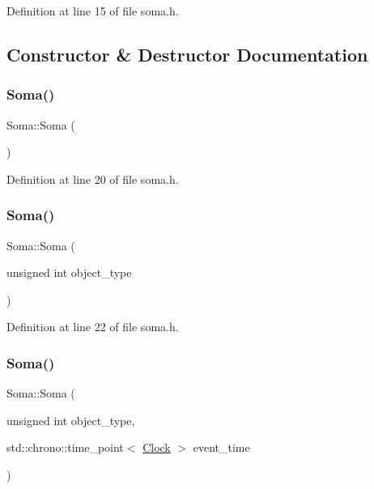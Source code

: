 Definition at line 15 of file soma.\+h.



\subsection{Constructor \& Destructor Documentation}
\mbox{\label{class_soma_abb9524743f65717d33797b45bff42441}} 
\subsubsection{\texorpdfstring{Soma()}{Soma()}\hspace{0.1cm}{\footnotesize\ttfamily [1/4]}}
{\footnotesize\ttfamily Soma\+::\+Soma (\begin{DoxyParamCaption}{ }\end{DoxyParamCaption})\hspace{0.3cm}{\ttfamily [inline]}}



Definition at line 20 of file soma.\+h.

\mbox{\label{class_soma_a5c0fb24d35ef360cdb830887952f44e5}} 
\subsubsection{\texorpdfstring{Soma()}{Soma()}\hspace{0.1cm}{\footnotesize\ttfamily [2/4]}}
{\footnotesize\ttfamily Soma\+::\+Soma (\begin{DoxyParamCaption}\item[{unsigned int}]{object\+\_\+type }\end{DoxyParamCaption})\hspace{0.3cm}{\ttfamily [inline]}}



Definition at line 22 of file soma.\+h.

\mbox{\label{class_soma_a9c9388e5b6562c39689768856d59ca51}} 
\subsubsection{\texorpdfstring{Soma()}{Soma()}\hspace{0.1cm}{\footnotesize\ttfamily [3/4]}}
{\footnotesize\ttfamily Soma\+::\+Soma (\begin{DoxyParamCaption}\item[{unsigned int}]{object\+\_\+type,  }\item[{std\+::chrono\+::time\+\_\+point$<$ \hyperlink{universe_8h_a0ef8d951d1ca5ab3cfaf7ab4c7a6fd80}{Clock} $>$}]{event\+\_\+time }\end{DoxyParamCaption})\hspace{0.3cm}{\ttfamily [inline]}}




